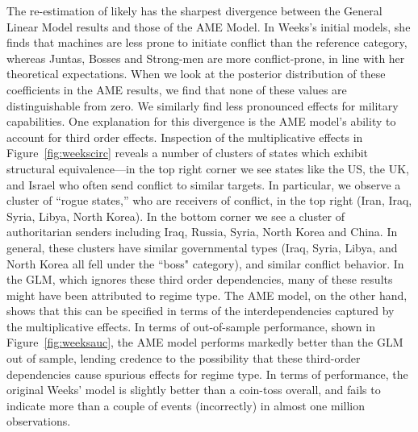 The re-estimation of \citet{weeks:2012} likely has the sharpest divergence between the General Linear Model results and those of the AME Model. In Weeks's initial models,  she finds that machines are less prone to initiate conflict than the reference category, whereas Juntas, Bosses and Strong-men are more conflict-prone, in line with her theoretical expectations. When we look at the posterior distribution of these coefficients in the AME results, we find that none of these values are distinguishable from zero. We similarly find less pronounced effects for military capabilities. One explanation for this divergence is the AME model's ability to account for third order effects. Inspection of the multiplicative effects in 
Figure~\ref{fig:weekscirc} reveals a number of clusters of states which exhibit structural equivalence---in the top right corner we see states like the US, the UK, and Israel who often send conflict to similar targets. In particular, we observe a cluster of ``rogue states,'' who are receivers of conflict, in the top right (Iran, Iraq, Syria, Libya, North Korea). In the bottom corner we see a cluster of authoritarian senders including Iraq, Russia, Syria, North Korea and China. In general, these clusters have similar governmental types (Iraq, Syria, Libya, and North Korea all fell under the ``boss" category), and similar conflict behavior. In the GLM, which ignores these third order dependencies, many of these results might have been attributed to regime type. The AME model, on the other hand, shows that this can be specified in terms of the interdependencies captured by the multiplicative effects. In terms of out-of-sample performance, shown in Figure~\ref{fig:weeksauc}, the AME model performs markedly better than the GLM out of sample, lending credence to the possibility that these third-order dependencies cause spurious effects for regime type.  In terms of performance, the original Weeks' model is slightly better than a coin-toss overall, and fails to indicate more than a couple of events (incorrectly) in almost one million observations. 

